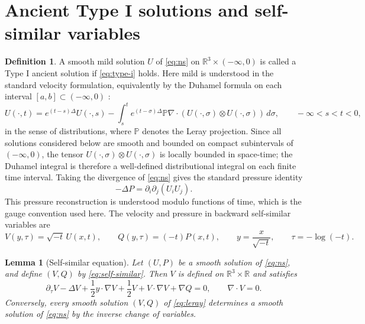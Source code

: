 \documentclass[11pt]{amsart}
\theoremstyle{plain}
\newtheorem{lemma}[theorem]{Lemma}
\theoremstyle{definition}
\newtheorem{definition}[theorem]{Definition}
\theoremstyle{remark}
\numberwithin{equation}{section}
\begin{document}
\section{Ancient Type I solutions and self-similar variables}

\begin{definition}\label{def:type-i-ancient}
A smooth mild solution \(U\) of \eqref{eq:ns} on
\(\mathbb R^3\times(-\infty,0)\) is called a Type I ancient solution if
\eqref{eq:type-i} holds.  Here mild is understood in the standard velocity
formulation, equivalently by the Duhamel formula on each interval
\([a,b]\subset(-\infty,0)\) \cite{Kato1984,Sohr2001}:
\begin{equation}\label{eq:mild-formula}
   U(\cdot,t)=e^{(t-s)\Delta}U(\cdot,s)
   -\int_s^t e^{(t-\sigma)\Delta}\mathbb P\nabla\cdot
      (U(\cdot,\sigma)\otimes U(\cdot,\sigma))\,d\sigma,
      \qquad -\infty<s<t<0,
\end{equation}
in the sense of distributions, where \(\mathbb P\) denotes the Leray
projection.  Since all solutions considered below are smooth and bounded on
compact subintervals of \((-\infty,0)\), the tensor
\(U(\cdot,\sigma)\otimes U(\cdot,\sigma)\) is locally bounded in space-time;
the Duhamel integral is therefore a well-defined distributional integral on
each finite time interval.  Taking the divergence of \eqref{eq:ns} gives the
standard pressure identity
\[
   -\Delta P=\partial_i\partial_j(U_iU_j).
\]
This pressure reconstruction is understood modulo functions of time, which is
the gauge convention used here.
The velocity and pressure in backward self-similar variables are
\begin{equation}\label{eq:self-similar}
V(y,\tau)=\sqrt{-t}\,U(x,t),\qquad
Q(y,\tau)=(-t)P(x,t),\qquad
y=\frac{x}{\sqrt{-t}},\qquad
\tau=-\log(-t).
\end{equation}
\end{definition}

\begin{lemma}[Self-similar equation]\label{lem:self-similar-equation}
Let \((U,P)\) be a smooth solution of \eqref{eq:ns}, and define \((V,Q)\) by
\eqref{eq:self-similar}.  Then \(V\) is defined on
\(\mathbb R^3\times\mathbb R\) and satisfies
\begin{equation}\label{eq:leray}
\partial_\tau V-\Delta V+\frac12 y\cdot\nabla V+\frac12 V
 +V\cdot\nabla V+\nabla Q=0,\qquad \nabla\cdot V=0.
\end{equation}
Conversely, every smooth solution \((V,Q)\) of \eqref{eq:leray} determines a
smooth solution of \eqref{eq:ns} by the inverse change of variables.
\end{lemma}
\end{document}
